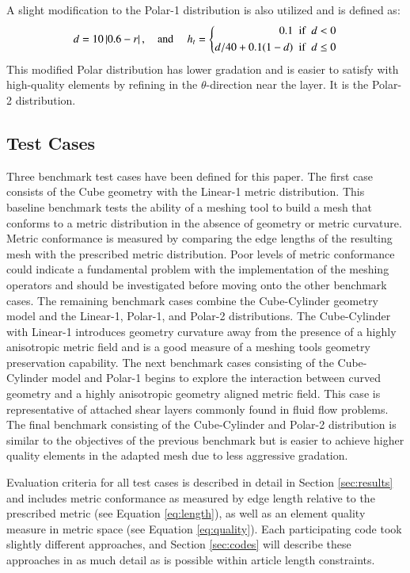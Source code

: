 \documentclass[3p,times,procedia,number]{elsarticle}
\begin{document}
A slight modification to the Polar-1 distribution is also utilized and is defined as:
\begin{equation}
  d = 10 \left|0.6 - r\right|, \textrm{\quad and \quad} h_t =  
  \left\{ 
  \begin{aligned}
  0.1  \textrm{\; if \;} &d < 0 \\
  d / 40 + 0.1 (1 - d)   \textrm{\; if \;}& d \leq 0
  \end{aligned}
  \right.
\end{equation}
This modified Polar distribution has lower gradation and
is easier to satisfy with high-quality elements by refining
in the $\theta$-direction near the layer.
It is the Polar-2 distribution.

\subsection{Test Cases}

Three benchmark test cases have been defined for this paper.
The first case consists of the Cube geometry with the Linear-1 metric distribution.
This baseline benchmark tests the ability of a meshing tool to build a mesh that conforms to a metric distribution in the absence of geometry or metric curvature.
Metric conformance is measured by comparing the edge lengths of the resulting mesh with the prescribed metric distribution.
Poor levels of metric conformance could indicate a fundamental problem with the implementation of the meshing operators and should be investigated before moving onto the other benchmark cases.
The remaining benchmark cases combine the Cube-Cylinder geometry model and the Linear-1, Polar-1, and Polar-2 distributions.
The Cube-Cylinder with Linear-1 introduces geometry curvature away from the presence of a highly anisotropic metric field and is a good measure of a meshing tools geometry preservation capability.
The next benchmark cases consisting of the Cube-Cylinder model and Polar-1 begins to explore the interaction between curved geometry and a highly anisotropic geometry aligned metric field.
This case is representative of attached shear layers commonly found in fluid flow problems.
The final benchmark consisting of the Cube-Cylinder and Polar-2 distribution is similar to the objectives of the previous benchmark but is easier to achieve higher quality elements in the adapted mesh due to less aggressive gradation.  

Evaluation criteria for all test cases is described in detail in Section \ref{sec:results} and includes metric conformance
as measured by edge length relative to the prescribed metric (see Equation \ref{eq:length}),
as well as an element quality measure in metric space (see Equation \ref{eq:quality}).
Each participating code took slightly different approaches, and Section \ref{sec:codes} will
describe these approaches in as much detail as is possible within article length constraints.
\end{document}
